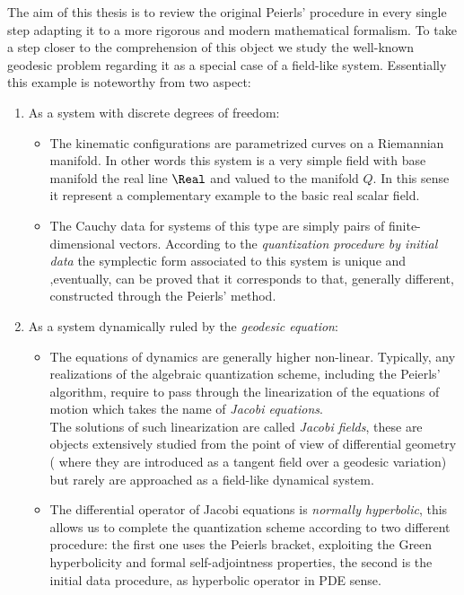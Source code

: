 \documentclass[Main]{subfiles}
\begin{document}
The aim of this thesis is to review the original Peierls' procedure in every single step adapting it to a more rigorous and modern mathematical formalism.
To take a step closer to the comprehension of this object we study the well-known geodesic problem regarding it as a special case of a field-like system.
Essentially this example is noteworthy from two aspect:
\begin{enumerate}
	\item As a system with discrete degrees of freedom:
	\begin{itemize}
		\item The kinematic configurations are parametrized curves on a Riemannian manifold.
				In other words this system is a very simple field with base manifold the real line $\Real$ and valued to the manifold $Q$. 
				In this sense it represent a complementary example to the basic real scalar field.
		\item The Cauchy data for systems of this type are simply pairs of finite-dimensional vectors.
			According to the \emph{quantization procedure by initial data} the symplectic form associated to this system is unique and ,eventually, can be proved that it corresponds to that, generally different, constructed through the Peierls' method.
	\end{itemize}

	\item As a system dynamically ruled by the \emph{geodesic equation}:
	\begin{itemize}
		\item The equations of dynamics are generally higher non-linear. 
		Typically, any realizations of the algebraic quantization scheme, including the Peierls' algorithm, require to pass through the linearization of the equations of motion which takes the name of \emph{Jacobi equations}.
			\\
			The solutions of such linearization are called \emph{Jacobi fields},
			these are objects extensively studied from the point of view of differential geometry 
			( where they are introduced as a tangent field over a geodesic variation) but rarely are approached as a field-like dynamical system.
		\item The differential operator of Jacobi equations is \emph{normally hyperbolic}, this allows us to complete the quantization scheme according to two different procedure: 
		the first one uses the Peierls bracket, exploiting the Green hyperbolicity and formal self-adjointness properties, 
		the second is the initial data procedure, as hyperbolic operator in PDE sense.
	\end{itemize}
\end{enumerate}
\end{document}
